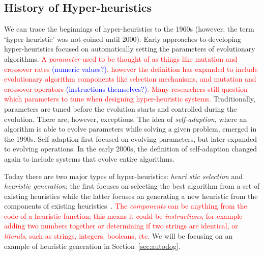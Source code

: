 \documentclass{sig-alternate}
\begin{document}
\subsection{History of Hyper-heuristics}
\label{sec:history}
We can trace the beginnings of hyper-heuristics to the 1960s (however, the term `hyper-heuristic' was not coined until 2000). Early approaches to developing hyper-heuristics focused on automatically setting the parameters of evolutionary algorithms. \textcolor{red}{A \textit{parameter} used to be thought of as things like mutation and crossover rates \textcolor{blue}{(numeric values?)}, however the definition has expanded to include evolutionary algorithm components like selection mechanisms, and mutation and crossover operators \textcolor{blue}{(instructions themselves?)}. Many researchers still question which parameters to tune when designing hyper-heuristic systems.}  Traditionally, parameters are tuned before the evolution starts and controlled during the evolution. There are, however, exceptions. The idea of \textit{self-adaption}, where an algorithm is able to evolve parameters while solving a given problem, emerged in the 1990s. Self-adaption first focused on evolving parameters, but later expanded to evolving operations. In the early 2000s, the definition of self-adaption changed again to include systems that evolve entire algorithms.~\cite{pappa:2014}

Today there are two major types of hyper-heuristics: \textit{heuri\- stic selection} and \textit{heuristic generation}; the first focuses on selecting the best algorithm from a set of existing heuristics while the latter focuses on generating a new heuristic from the components of existing heuristics~\cite{pappa:2014}. \textcolor{red}{The \textit{components} can be anything from the code of a heuristic function; this means it could be \textit{instructions}, for example adding two numbers together or determining if two strings are identical, or \textit{literals}, such as strings, integers, booleans, etc.}  We will be focusing on an example of heuristic generation in Section~\ref{sec:autodog}.
\end{document}
